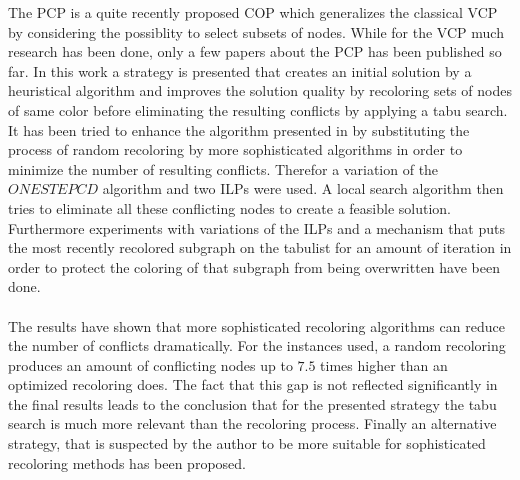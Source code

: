 
The PCP is a quite recently proposed COP which generalizes the classical VCP by considering the possiblity to select subsets of nodes. While for the VCP much research has been done, only a few papers about the PCP has been published so far. In this work a strategy is presented that creates an initial solution by a heuristical algorithm and improves the solution quality by recoloring sets of nodes of same color before eliminating the resulting conflicts by applying a tabu search. It has been tried to enhance the algorithm presented in \cite{noronha-06} by substituting the process of random recoloring by more sophisticated algorithms in order to minimize the number of resulting conflicts. Therefor a variation of the $\mathit{ONESTEPCD}$ algorithm \cite{li-00} and two ILPs were used. A local search algorithm then tries to eliminate all these conflicting nodes to create a feasible solution. Furthermore experiments with variations of the ILPs and a mechanism that puts the most recently recolored subgraph on the tabulist for an amount of iteration in order to protect the coloring of that subgraph from being overwritten have been done.\\\\
The results have shown that more sophisticated recoloring algorithms can reduce the number of conflicts dramatically. For the instances used, a random recoloring produces an amount of conflicting nodes up to $7.5$ times higher than an optimized recoloring does. The fact that this gap is not reflected significantly in the final results leads to the conclusion that for the presented strategy the tabu search is much more relevant than the recoloring process. Finally an alternative strategy, that is suspected by the author to be more suitable for sophisticated recoloring methods has been proposed.
